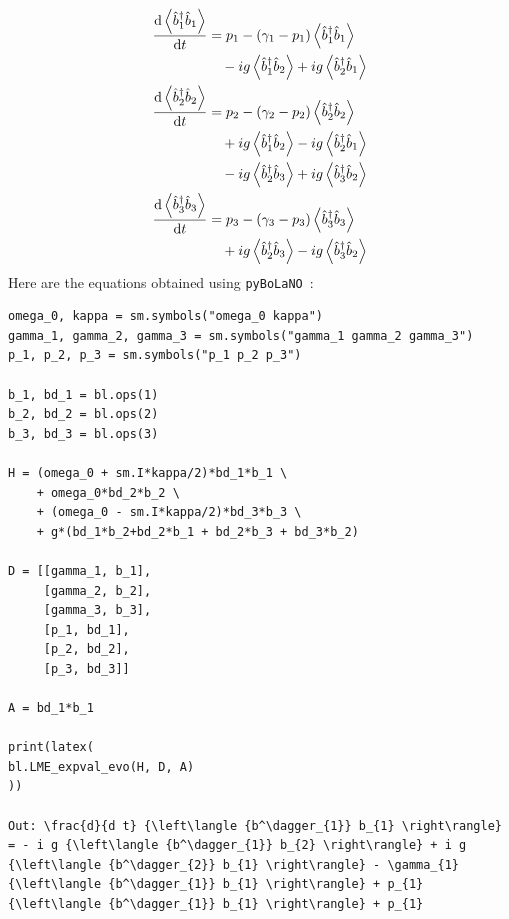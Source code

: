 \documentclass[onecolumn, 12pt, sort&compress]{elsarticle}
\newcommand{\expval}[1]{\left\langle{#1}\right\rangle}
\newcommand{\bop}{\hat{b}}
\newcommand{\bdag}{\bop^\dagger}
\newcommand{\pybolano}{\texttt{pyBoLaNO}~}
\begin{document}
\begin{subequations}
\begin{align}
    \begin{split}
        \odv{\expval{\bdag_1\bop_1}}{t}
        &= p_1-\left(\gamma_1-p_1\right)\expval{\bdag_1\bop_1}
        \\ 
        &\quad -ig\expval{\bdag_1\bop_2}+ig\expval{\bdag_2\bop_1}
    \end{split}
    \\
    \begin{split}
    \odv{\expval{\bdag_2\bop_2}}{t} 
    &= 
    p_2 - \left(\gamma_2-p_2\right)\expval{\bdag_2\bop_2}
    \\ 
    &\quad +ig\expval{\bdag_1\bop_2}  -ig \expval{\bdag_2\bop_1}
    \\ 
    &\quad - ig\expval{\bdag_2\bop_3} + ig\expval{\bdag_3\bop_2}
    \end{split}
    \\
    \begin{split}
    \odv{\expval{\bdag_3\bop_3}}{t} 
    &= 
    p_3 - \left(\gamma_3-p_3\right) \expval{\bdag_3\bop_3}
    \\ 
    &\quad +ig\expval{\bdag_2\bop_3} - ig\expval{\bdag_3\bop_2}
    \end{split}
\end{align}
\end{subequations}
Here are the equations obtained using \pybolano:
\begin{verbatim}
omega_0, kappa = sm.symbols("omega_0 kappa")
gamma_1, gamma_2, gamma_3 = sm.symbols("gamma_1 gamma_2 gamma_3")
p_1, p_2, p_3 = sm.symbols("p_1 p_2 p_3")

b_1, bd_1 = bl.ops(1)
b_2, bd_2 = bl.ops(2)
b_3, bd_3 = bl.ops(3)

H = (omega_0 + sm.I*kappa/2)*bd_1*b_1 \
    + omega_0*bd_2*b_2 \
    + (omega_0 - sm.I*kappa/2)*bd_3*b_3 \
    + g*(bd_1*b_2+bd_2*b_1 + bd_2*b_3 + bd_3*b_2)
    
D = [[gamma_1, b_1],
     [gamma_2, b_2],
     [gamma_3, b_3],
     [p_1, bd_1],
     [p_2, bd_2],
     [p_3, bd_3]]

A = bd_1*b_1

print(latex(
bl.LME_expval_evo(H, D, A)
))

Out: \frac{d}{d t} {\left\langle {b^\dagger_{1}} b_{1} \right\rangle} = - i g {\left\langle {b^\dagger_{1}} b_{2} \right\rangle} + i g {\left\langle {b^\dagger_{2}} b_{1} \right\rangle} - \gamma_{1} {\left\langle {b^\dagger_{1}} b_{1} \right\rangle} + p_{1} {\left\langle {b^\dagger_{1}} b_{1} \right\rangle} + p_{1}
\end{verbatim}
\end{document}
